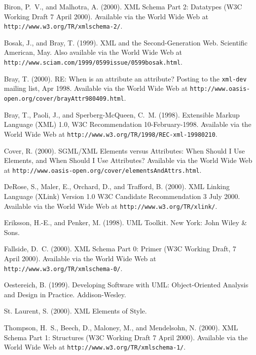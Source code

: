\documentclass[10pt]{article}
\newcommand{\url}[1]{\texttt{#1}}
\begin{document}

\setlength{\parskip}{1.2ex}

\begin{flushleft}

Biron, P.~V., and Malhotra, A.  (2000).  XML Schema Part 2: Datatypes (W3C
Working Draft 7 April 2000).  Available via the World Wide Web at
\url{http://www.w3.org/TR/xmlschema-2/}.

Bosak, J., and Bray, T. (1999).  {XML} and the Second-Generation Web.
Scientific American, May.  Also available via the World Wide Web at
\url{http://www.sciam.com/1999/0599issue/0599bosak.html}.

Bray, T. (2000).  RE: When is an attribute an attribute?  Posting to the
\url{xml-dev} mailing list, Apr 1998.  Available via the World Wide Web at
\url{http://www.oasis-open.org/cover/brayAttr980409.html}.

Bray, T., Paoli, J., and Sperberg-McQueen, C.~M. (1998). Extensible Markup
Language (XML) 1.0, W3C Recommendation 10-February-1998.  Available via the
World Wide Web at \url{http://www.w3.org/TR/1998/REC-xml-19980210}.

Cover, R.  (2000).  SGML/XML Elements versus Attributes: When Should I Use
Elements, and When Should I Use Attributes?   Available via the World Wide
Web at \url{http://www.oasis-open.org/cover/elementsAndAttrs.html}.

DeRose, S., Maler, E., Orchard, D., and Trafford, B. (2000).  XML Linking
Language (XLink) Version 1.0 W3C Candidate Recommendation 3 July 2000.
Available via the World Wide Web at \url{http://www.w3.org/TR/xlink/}.

Eriksson, H.-E., and Penker, M. (1998).  UML Toolkit.  New York: John Wiley
\& Sons.

Fallside, D.~C.  (2000).  XML Schema Part 0: Primer (W3C Working Draft, 7
April 2000).  Available via the World Wide Web at
\url{http://www.w3.org/TR/xmlschema-0/}.

Oestereich, B.  (1999).  Developing Software with UML: Object-Oriented
Analysis and Design in Practice.  Addison-Wesley.

St. Laurent, S. (2000).  XML Elements of Style. 

Thompson, H.~S., Beech, D., Maloney, M., and Mendelsohn, N. (2000).  XML
Schema Part 1: Structures (W3C Working Draft 7 April 2000).  Available via
the World Wide Web at \url{http://www.w3.org/TR/xmlschema-1/}.

\end{flushleft}
\end{document}
